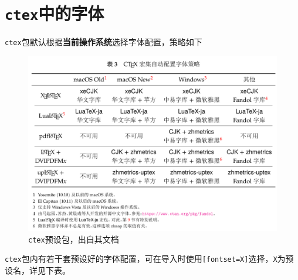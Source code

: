 \documentclass[10pt,openany]{book}
\begin{document}
\section{\texttt{ctex}中的字体}

\texttt{ctex}包默认根据\textbf{当前操作系统}选择字体配置，策略如下

\begin{figure}[H]
    \centering
    \includegraphics[width=\linewidth]{data/ctex.png}
    \caption{\texttt{ctex}预设包，出自其文档}
\end{figure}

\texttt{ctex}包内有若干套预设好的字体配置，可在导入时使用\texttt{[fontset=X]}选择，\texttt{X}为预设名，详见下表。
\end{document}
